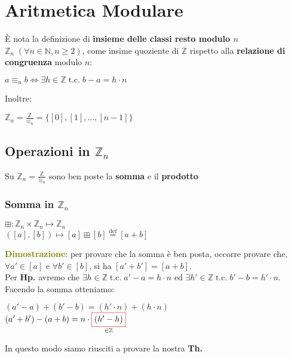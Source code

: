 \chapter{Aritmetica Modulare}
È nota la definizione di \textbf{insieme delle classi resto modulo $n$} $\mathbb{Z}_n \; (\forall n \in \mathbb{N}, n \geq 2)$, come insime quoziente di $\mathbb{Z}$ rispetto alla \textbf{relazione di congruenza} modulo $n$:

{\centering
    $a \equiv_n b \Longleftrightarrow \exists h \in \mathbb{Z} \; \text{t.c.} \; b - a = h \cdot n$
\par}
Inoltre:

{\centering
    $\mathbb{Z}_n = \frac{\mathbb{Z}}{\equiv_n} = \{[0], [1], ..., [n-1]\}$
\par}

\section{Operazioni in $\mathbb{Z}_n$}
Su $\mathbb{Z}_n = \frac{\mathbb{Z}}{\equiv_n}$ sono ben poste la \textbf{somma} e il \textbf{prodotto}

\subsection{Somma in $\mathbb{Z}_n$}

{\centering
    $\boxplus : \mathbb{Z}_n \times \mathbb{Z}_n \mapsto \mathbb{Z}_n$ \\
    $([a], [b]) \mapsto [a] \boxplus [b] \overset{\text{def}}{=} [a + b]$
\par}

\begin{boxA}
    \textcolor{olive}{\textbf{Dimostrazione}}: per provare che la somma è ben posta, occorre provare che, $\forall a' \in [a]$ e $\forall b' \in [b]$, si ha $[a' + b'] = [a + b]$. \\ 
    Per \textbf{Hp.} avremo che $\exists h \in \mathbb{Z} \; \text{t.c.} \; a' - a = h \cdot n$ ed $\exists h' \in \mathbb{Z} \; \text{t.c.} \; b' - b = h' \cdot n$. Facendo la somma otteniamo:

    {\centering
        $(a' - a) + (b' - b) = (h' \cdot n) + (h \cdot n)$ \\
        $(a' + b') - (a + b) = n \cdot \underset{\in \mathbb{Z}}{\fcolorbox{red}{white}{$(h' - h)$}}$
    \par}
    In questo modo siamo riusciti a provare la nostra \textbf{Th.}
\end{boxA}

